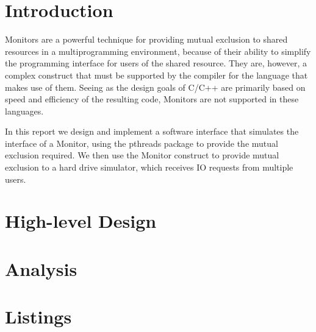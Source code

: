 \documentclass{report}
\begin{document}

\section{Introduction}
Monitors are a powerful technique for providing mutual exclusion to shared
resources in a multiprogramming environment, because of their ability to simplify the
programming interface for users of the shared resource. They are, however, a complex
construct that must be supported by the compiler for the language that makes use of them.
Seeing as the design goals of C/C++ are primarily based on speed and efficiency of the
resulting code, Monitors are not supported in these languages. 

In this report we design and implement a software interface that simulates the interface
of a Monitor, using the pthreads package to provide the mutual exclusion required. We then
use the Monitor construct to provide mutual exclusion to a hard drive simulator, which receives IO requests 
from multiple users.

\section{High-level Design} %

\section{Analysis} %

\section{Listings} %


\tableofcontents %
\end{document}
